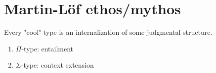 \documentclass[11pt]{article}
\begin{document}
\section{Martin-L\"of ethos/mythos}
Every "cool" type is an internalization of some judgmental structure.
\begin{enumerate}
    \item $\Pi$-type: entailment
    \begin{prooftree*}
    \end{prooftree*}
    \item $\Sigma$-type: context extension
    \begin{prooftree*}
    \end{prooftree*}
\end{enumerate}
\end{document}
